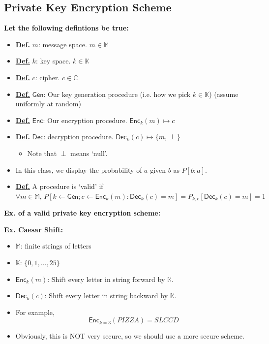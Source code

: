 \documentclass[11pt]{article}
\newcommand{\defn}{\underline{\textbf{Def.}} }
\newcommand{\Gen}{\textsf{Gen}}
\newcommand{\Enc}{\textsf{Enc}}
\newcommand{\Dec}{\textsf{Dec}}
\begin{document}
\subsection{Private Key Encryption Scheme}
\textbf{Let the following defintions be true:}
\begin{itemize}
    \item \defn \(m\): message space. \(m \in \mathbb{M}\)
    \item \defn \(k\): key space. \(k \in \mathbb{K}\)
    \item \defn \(c\): cipher. \(c \in \mathbb{C}\)
    \item \defn \(\Gen\): Our key generation procedure (i.e. how we pick \(k \in \mathbb{K}\)) (assume uniformly at random)
    \item \defn \(\Enc\): Our encryption procedure. \(\Enc_k(m) \mapsto c\)
    \item \defn \(\Dec\): decryption procedure. \(\Dec_k(c) \mapsto \{m, \perp\}\)
    \begin{itemize}
        \item Note that \(\perp\) means `null'.
    \end{itemize}
    \item In this class, we display the probability of \(a\) given \(b\) as \(P[b : a]\).
    \item \defn A procedure is `valid' if \(\forall m \in \mathbb{M}, \, P[k \leftarrow \Gen; c \leftarrow \Enc_k(m) : \Dec_k(c) = m] = P_{k,c}[\Dec_k(c) = m] = 1\)
\end{itemize}

\noindent \textbf{Ex. of a valid private key encryption scheme:}

\noindent \textbf{Ex. Caesar Shift:}
\begin{itemize}
    \item \(\mathbb{M}\): finite strings of letters
    \item \(\mathbb{K}\): \(\{0, 1, \ldots, 25\}\)
    \item \(\Enc_k(m)\): Shift every letter in string forward by \(\mathbb{K}\).
    \item \(\Dec_k(c)\): Shift every letter in string backward by \(\mathbb{K}\).
    \item For example,
    \[
    \Enc_{k=3}(PIZZA) = SLCCD
    \]
    \item Obviously, this is NOT very secure, so we should use a more secure scheme.
\end{itemize}
\end{document}
